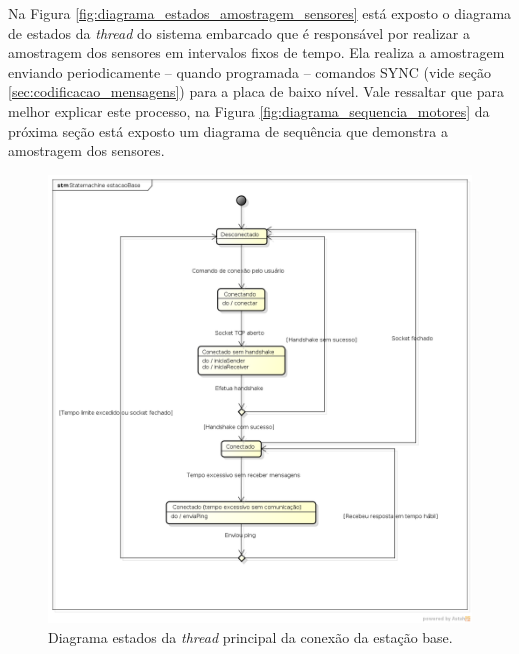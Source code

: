 Na Figura \ref{fig:diagrama_estados_amostragem_sensores} está exposto o diagrama de estados da \textit{thread} do sistema embarcado que é responsável por realizar a amostragem dos sensores em intervalos fixos de tempo. Ela realiza a amostragem enviando periodicamente -- quando programada -- comandos SYNC (vide seção \ref{sec:codificacao_mensagens}) para a placa de baixo nível. Vale ressaltar que para melhor explicar este processo, na Figura \ref{fig:diagrama_sequencia_motores} da próxima seção está exposto um diagrama de sequência que demonstra a amostragem dos sensores.



\begin{figure}[H]
  \centering
  \includegraphics[width=\textwidth, keepaspectratio]{./figuras/diagrama_estados_estacao_base.png}
  \caption{Diagrama estados da \textit{thread} principal da conexão da estação base.}
  \label{fig:diagrama_estados_estacao_base}
\end{figure}

